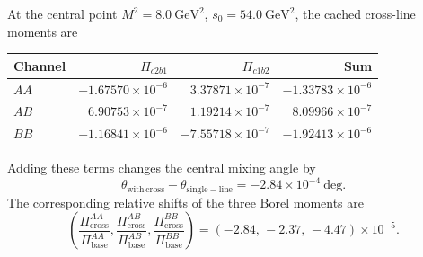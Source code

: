 \documentclass[11pt]{article}
\begin{document}
At the central point \(M^2=8.0~\mathrm{GeV}^2\), \(s_0=54.0~\mathrm{GeV}^2\),
the cached cross-line moments are
\begin{center}
\begin{tabular}{lrrr}
\hline
Channel & \(\Pi_{c2b1}\) & \(\Pi_{c1b2}\) & Sum \\
\hline
\(AA\) & \(-1.67570\times 10^{-6}\) & \(3.37871\times 10^{-7}\) & \(-1.33783\times 10^{-6}\) \\
\(AB\) & \(6.90753\times 10^{-7}\) & \(1.19214\times 10^{-7}\) & \(8.09966\times 10^{-7}\) \\
\(BB\) & \(-1.16841\times 10^{-6}\) & \(-7.55718\times 10^{-7}\) & \(-1.92413\times 10^{-6}\) \\
\hline
\end{tabular}
\end{center}
Adding these terms changes the central mixing angle by
\begin{equation}
  \theta_{\mathrm{with\,cross}}-\theta_{\mathrm{single-line}}
  =
  -2.84\times10^{-4}\ \mathrm{deg}.
\end{equation}
The corresponding relative shifts of the three Borel moments are
\begin{equation}
  \left(
  \frac{\Pi^{AA}_{\mathrm{cross}}}{\Pi^{AA}_{\mathrm{base}}},
  \frac{\Pi^{AB}_{\mathrm{cross}}}{\Pi^{AB}_{\mathrm{base}}},
  \frac{\Pi^{BB}_{\mathrm{cross}}}{\Pi^{BB}_{\mathrm{base}}}
  \right)
  =
  (-2.84,\,-2.37,\,-4.47)\times10^{-5}.
\end{equation}
\end{document}
